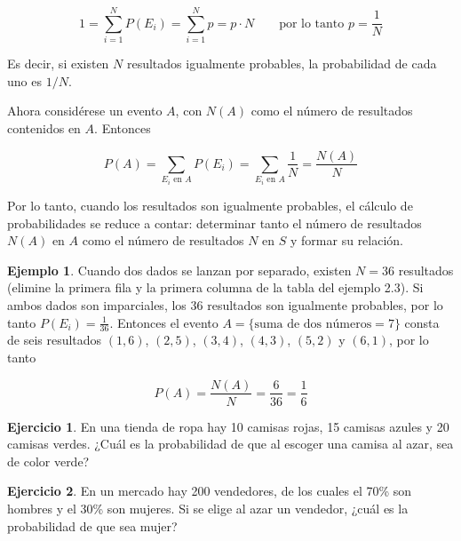 \documentclass[
  11pt,
]{book}
\theoremstyle{definition}
\theoremstyle{definition}
\newtheorem{example}{Ejemplo}[chapter]
\theoremstyle{definition}
\newtheorem{exercise}{Ejercicio}[chapter]
\theoremstyle{definition}
\theoremstyle{remark}
\begin{document}
\[
1 = \sum_{i=1}^{N} P(E_{i}) = \sum_{i=1}^{N} p = p \cdot N \qquad \text{por lo tanto } p = \frac{1}{N}
\]

Es decir, si existen \(N\) resultados igualmente probables, la probabilidad de cada uno es \(1/N\).

Ahora considérese un evento \(A\), con \(N(A)\) como el número de resultados contenidos en \(A\). Entonces

\[
P(A) = \sum_{E_{i} \text{ en } A} P(E_{i}) = \sum_{E_{i} \text{ en } A} \frac{1}{N} = \frac{N(A)}{N}
\]

Por lo tanto, cuando los resultados son igualmente probables, el cálculo de probabilidades se reduce a contar: determinar tanto el número de resultados \(N(A)\) en \(A\) como el número de resultados \(N\) en \(S\) y formar su relación.

\begin{example}
Cuando dos dados se lanzan por separado, existen \(N = 36\) resultados (elimine la primera fila y la primera columna de la tabla del ejemplo 2.3). Si ambos dados son imparciales, los 36 resultados son igualmente probables, por lo tanto \(P(E_{i}) = \frac{1}{36}\). Entonces el evento \(A = \{\text{suma de dos números} = 7\}\) consta de seis resultados \((1, 6)\), \((2, 5)\), \((3, 4)\), \((4, 3)\), \((5, 2)\) y \((6, 1)\), por lo tanto

\[
P(A) = \frac{N(A)}{N} = \frac{6}{36} = \frac{1}{6}
\]
\end{example}

\begin{exercise}
En una tienda de ropa hay 10 camisas rojas, 15 camisas azules y 20 camisas verdes. ¿Cuál es la probabilidad de que al escoger una camisa al azar, sea de color verde?
\end{exercise}

\begin{exercise}
En un mercado hay 200 vendedores, de los cuales el 70\% son hombres y el 30\% son mujeres. Si se elige al azar un vendedor, ¿cuál es la probabilidad de que sea mujer?
\end{exercise}
\end{document}
